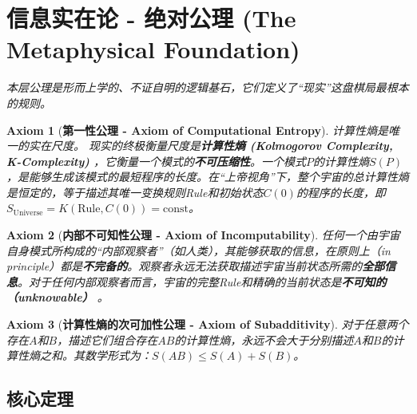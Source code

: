 \documentclass[11pt, a4paper]{article}
\newtheorem{axiom}{Axiom}[section]
\begin{document}
\section{信息实在论 - 绝对公理 (The Metaphysical Foundation)}
\textit{本层公理是形而上学的、不证自明的逻辑基石，它们定义了“现实”这盘棋局最根本的规则。}

\begin{axiom}[\textbf{第一性公理 - Axiom of Computational Entropy}]
计算性熵是唯一的实在尺度。
现实的终极衡量尺度是\textbf{计算性熵 (Kolmogorov Complexity, K-Complexity)} \cite{Kolmogorov1965}，它衡量一个模式的\textbf{不可压缩性}。一个模式$P$的计算性熵$S(P)$，是能够生成该模式的最短程序的长度。在“上帝视角”下，整个宇宙的总计算性熵是恒定的，等于描述其唯一变换规则Rule和初始状态$C(0)$的程序的长度，即$S_{\text{Universe}} = K(\text{Rule}, C(0)) = \text{const}$。
\end{axiom}

\begin{axiom}[\textbf{内部不可知性公理 - Axiom of Incomputability}]
任何一个由宇宙自身模式所构成的“内部观察者”（如人类），其能够获取的信息，在原则上（in principle）都是\textbf{不完备的}。观察者永远无法获取描述宇宙当前状态所需的\textbf{全部信息}。对于任何内部观察者而言，宇宙的完整Rule和精确的当前状态是\textbf{不可知的（unknowable）} \cite{Turing1936}。
\end{axiom}

\begin{axiom}[\textbf{计算性熵的次可加性公理 - Axiom of Subadditivity}]
对于任意两个存在$A$和$B$，描述它们组合存在$AB$的计算性熵，永远不会大于分别描述$A$和$B$的计算性熵之和。其数学形式为：$S(AB) \le S(A) + S(B)$。
\end{axiom}

\subsection*{核心定理}
\end{document}
